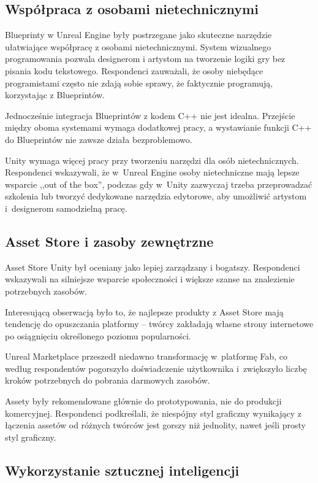 \subsection{Współpraca z osobami nietechnicznymi}
\label{subsec:wspolpraca-nietechniczna}


Blueprinty w Unreal Engine były postrzegane jako skuteczne narzędzie ułatwiające współpracę z osobami nietechnicznymi. System wizualnego programowania pozwala designerom i artystom na tworzenie logiki gry bez pisania kodu tekstowego. Respondenci zauważali, że osoby niebędące programistami często nie zdają sobie sprawy, że faktycznie programują, korzystając z Blueprintów.

Jednocześnie integracja Blueprintów z kodem C++ nie jest idealna. Przejście między oboma systemami wymaga dodatkowej pracy, a wystawianie funkcji C++ do Blueprintów nie zawsze działa bezproblemowo.


Unity wymaga więcej pracy przy tworzeniu narzędzi dla osób
nietechnicznych. Respondenci wskazywali, że w~Unreal Engine osoby
nietechniczne mają lepsze wsparcie ,,out of the box'', podczas gdy
w~Unity zazwyczaj trzeba przeprowadzać szkolenia lub tworzyć
dedykowane narzędzia edytorowe, aby umożliwić artystom
i~designerom samodzielną pracę.

\subsection{Asset Store i zasoby zewnętrzne}
\label{subsec:asset-store}


Asset Store Unity był oceniany jako lepiej zarządzany i bogatszy.
Respondenci wskazywali na silniejsze wsparcie społeczności i większe szanse na 
znalezienie potrzebnych zasobów.

Interesującą obserwacją było to, że najlepsze produkty z Asset Store mają tendencję do 
opuszczania platformy -- twórcy zakładają własne strony internetowe po osiągnięciu określonego 
poziomu popularności.

Unreal Marketplace przeszedł niedawno transformację w~platformę Fab,
co według respondentów pogorszyło doświadczenie użytkownika
i~zwiększyło liczbę kroków potrzebnych do pobrania darmowych zasobów.


Assety były rekomendowane głównie do prototypowania, nie do produkcji komercyjnej. Respondenci podkreślali, że niespójny styl graficzny wynikający z łączenia assetów od różnych twórców jest gorszy niż jednolity, nawet jeśli prosty styl graficzny.

\subsection{Wykorzystanie sztucznej inteligencji}
\label{subsec:ai}


